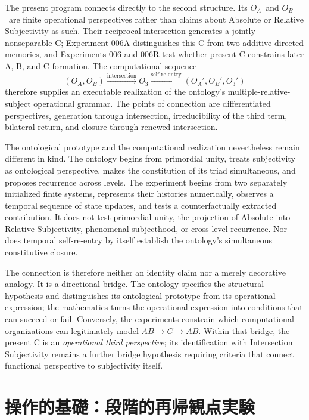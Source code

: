 \documentclass[11pt,a4paper]{article}
\newcommand{\OA}{\ensuremath{O_{A}}}
\newcommand{\OB}{\ensuremath{O_{B}}}
\newcommand{\Othree}{\ensuremath{O_{3}}}
\begin{document}
The present program connects directly to the second structure. Its \OA\ and \OB\ are finite operational perspectives rather than claims about Absolute or Relative Subjectivity as such. Their reciprocal intersection generates a jointly nonseparable C; Experiment 006A distinguishes this C from two additive directed memories, and Experiments 006 and 006R test whether present C constrains later A, B, and C formation. The computational sequence
\[
 (\OA,\OB)\xrightarrow{\text{intersection}}\Othree
 \xrightarrow{\text{self-re-entry}}(\OA',\OB',\Othree')
\]
therefore supplies an executable realization of the ontology's multiple-relative-subject operational grammar. The points of connection are differentiated perspectives, generation through intersection, irreducibility of the third term, bilateral return, and closure through renewed intersection.

The ontological prototype and the computational realization nevertheless remain different in kind. The ontology begins from primordial unity, treats subjectivity as ontological perspective, makes the constitution of its triad simultaneous, and proposes recurrence across levels. The experiment begins from two separately initialized finite systems, represents their histories numerically, observes a temporal sequence of state updates, and tests a counterfactually extracted contribution. It does not test primordial unity, the projection of Absolute into Relative Subjectivity, phenomenal subjecthood, or cross-level recurrence. Nor does temporal self-re-entry by itself establish the ontology's simultaneous constitutive closure.

The connection is therefore neither an identity claim nor a merely decorative analogy. It is a directional bridge. The ontology specifies the structural hypothesis and distinguishes its ontological prototype from its operational expression; the mathematics turns the operational expression into conditions that can succeed or fail. Conversely, the experiments constrain which computational organizations can legitimately model $AB\rightarrow C\rightarrow AB$. Within that bridge, the present C is an \emph{operational third perspective}; its identification with Intersection Subjectivity remains a further bridge hypothesis requiring criteria that connect functional perspective to subjectivity itself.

\section{操作的基礎：段階的再帰観点実験}
\end{document}
